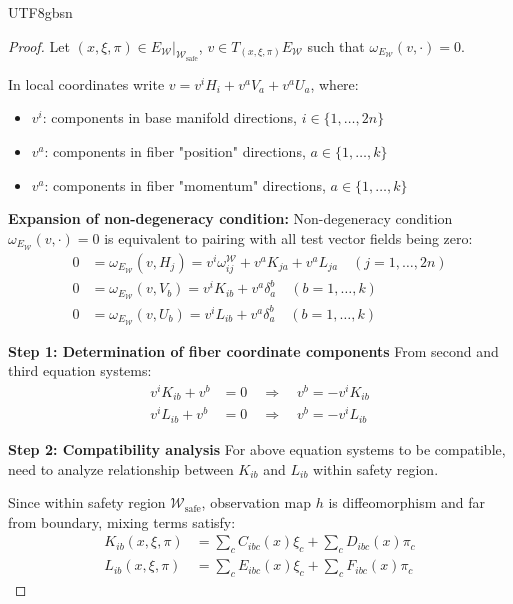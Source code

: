 \documentclass[a4paper,12pt]{extarticle}
\theoremstyle{definition}
\begin{document}
\begin{CJK}{UTF8}{gbsn}
\begin{proof}
Let $(x,\xi,\pi) \in E_{\mathcal{W}}|_{\mathcal{W}_{\text{safe}}}$, $v \in T_{(x,\xi,\pi)}E_{\mathcal{W}}$ such that $\omega_{E_{\mathcal{W}}}(v, \cdot) = 0$.

In local coordinates write $v = v^i H_i + v^a V_a + v^a U_a$, where:
\begin{itemize}
\item $v^i$: components in base manifold directions, $i \in \{1,\ldots,2n\}$
\item $v^a$: components in fiber "position" directions, $a \in \{1,\ldots,k\}$
\item $v^a$: components in fiber "momentum" directions, $a \in \{1,\ldots,k\}$
\end{itemize}

\textbf{Expansion of non-degeneracy condition:}
Non-degeneracy condition $\omega_{E_{\mathcal{W}}}(v, \cdot) = 0$ is equivalent to pairing with all test vector fields being zero:
\begin{align*}
0 &= \omega_{E_{\mathcal{W}}}(v, H_j) = v^i \omega_{ij}^{\mathcal{W}} + v^a K_{ja} + v^a L_{ja} \quad (j = 1,\ldots,2n)\\
0 &= \omega_{E_{\mathcal{W}}}(v, V_b) = v^i K_{ib} + v^a \delta_a^b \quad (b = 1,\ldots,k)\\
0 &= \omega_{E_{\mathcal{W}}}(v, U_b) = v^i L_{ib} + v^a \delta_a^b \quad (b = 1,\ldots,k)
\end{align*}

\textbf{Step 1: Determination of fiber coordinate components}
From second and third equation systems:
\begin{align*}
v^i K_{ib} + v^b &= 0 \quad \Rightarrow \quad v^b = -v^i K_{ib}\\
v^i L_{ib} + v^b &= 0 \quad \Rightarrow \quad v^b = -v^i L_{ib}
\end{align*}

\textbf{Step 2: Compatibility analysis}
For above equation systems to be compatible, need to analyze relationship between $K_{ib}$ and $L_{ib}$ within safety region.

Since within safety region $\mathcal{W}_{\text{safe}}$, observation map $h$ is diffeomorphism and far from boundary, mixing terms satisfy:
\begin{align*}
K_{ib}(x,\xi,\pi) &= \sum_c C_{ibc}(x)\xi_c + \sum_c D_{ibc}(x)\pi_c\\
L_{ib}(x,\xi,\pi) &= \sum_c E_{ibc}(x)\xi_c + \sum_c F_{ibc}(x)\pi_c
\end{align*}


\end{proof}
\end{CJK}
\end{document}
